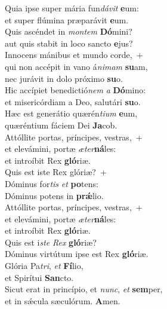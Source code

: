 \evenverse Quia ipse super mária fun\textit{dá}\textit{vit} \textbf{e}um:~\*\\
\evenverse et super flúmina præparávit \textbf{e}um.\\
\oddverse Quis ascéndet in \textit{mon}\textit{tem} \textbf{Dó}mini?~\*\\
\oddverse aut quis stabit in loco sancto \textbf{e}jus?\\
\evenverse Innocens mánibus et mundo corde,~+\\
\evenverse  qui non accépit in vano á\textit{ni}\textit{mam} \textbf{su}am,~\*\\
\evenverse nec jurávit in dolo próximo \textbf{su}o.\\
\oddverse Hic accípiet benedictió\textit{nem} \textit{a} \textbf{Dó}mino:~\*\\
\oddverse et misericórdiam a Deo, salutári \textbf{su}o.\\
\evenverse Hæc est generátio quærén\textit{ti}\textit{um} \textbf{e}um,~\*\\
\evenverse quæréntium fáciem Dei \textbf{Ja}cob.\\
\oddverse Attóllite portas, príncipes, vestras,~+\\
\oddverse  et elevámini, portæ \textit{æ}\textit{ter}\textbf{ná}les:~\*\\
\oddverse et introíbit Rex \textbf{gló}riæ.\\
\evenverse Quis est iste Rex glóriæ?~+\\
\evenverse  Dóminus for\textit{tis} \textit{et} \textbf{po}tens:~\*\\
\evenverse Dóminus potens in \textbf{prǽ}lio.\\
\oddverse Attóllite portas, príncipes, vestras,~+\\
\oddverse  et elevámini, portæ \textit{æ}\textit{ter}\textbf{ná}les:~\*\\
\oddverse et introíbit Rex \textbf{gló}riæ.\\
\evenverse Quis est i\textit{ste} \textit{Rex} \textbf{gló}riæ?~\*\\
\evenverse Dóminus virtútum ipse est Rex \textbf{gló}riæ.\\
\oddverse Glória Pa\textit{tri}, \textit{et} \textbf{Fí}lio,~\*\\
\oddverse et Spirítui \textbf{San}cto.\\
\evenverse Sicut erat in princípio, et \textit{nunc}, \textit{et} \textbf{sem}per,~\*\\
\evenverse et in sǽcula sæculórum. \textbf{A}men.\\
